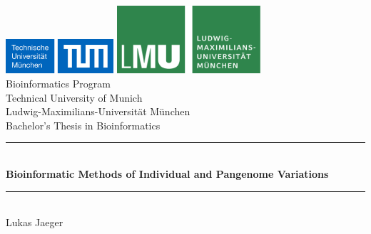 \documentclass[a4paper,11pt,twoside,openright]{report}
\newcommand{\HRule}{\rule{\linewidth}{0.5mm}}
\begin{document}
\begin{titlepage}


\sffamily

\begin{center}


\includegraphics[width=0.3\textwidth]{pics/logo2}
\hfill
\includegraphics[width=0.4\textwidth]{pics/logo1}  
\\[5cm]

{\Large Bioinformatics Program}\\[0.5cm]
{\Large Technical University of Munich}\\[0.5cm]
{\Large Ludwig-Maximilians-Universit\"at M\"unchen}\\[2cm]
{\Large Bachelor's Thesis in Bioinformatics}\\[1.5cm]

\HRule \\[0.4cm]
{ \huge \bfseries Bioinformatic Methods of Individual and Pangenome Variations}\\[0.4cm]

\HRule \\[1.5cm]

{\Large Lukas Jaeger}\\[2.5cm]

\vfill
\end{center}
\end{titlepage}
\pagestyle{empty}
\end{document}
